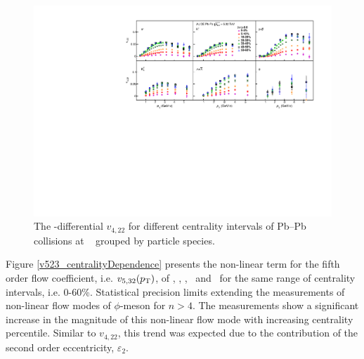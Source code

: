 \begin{figure}[!htb]
\begin{center}
\includegraphics[scale=0.82]{figures/results/All_v422_gap00_CentDep_PID2.pdf}
\end{center}
\caption{The \pT-differential $v_{4,22}$ for different centrality intervals of Pb--Pb collisions at \sNN~ grouped by particle species.}
\label{v422_centralityDependence}
\end{figure}
 
Figure \ref{v523_centralityDependence} presents the non-linear term for the fifth order flow coefficient, i.e. $v_{5,32}(p_{\rm{T}})$, of \pion, \kaon, \proton, \lambdas~and \Ks~for the same range of centrality intervals, i.e. 0-60\%. Statistical precision
limits extending the measurements of non-linear flow modes of $\phi$-meson for $n>4$. The measurements show a significant increase in the magnitude of this non-linear flow mode with increasing centrality percentile. Similar to $v_{4,22}$, this trend was expected due to the contribution of the second order eccentricity, $\varepsilon_{2}$.

